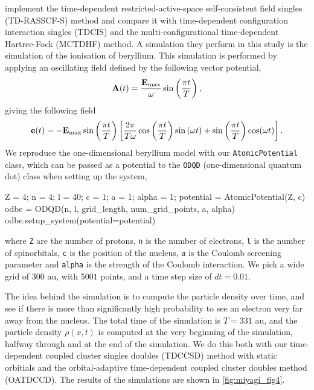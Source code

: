 \citeauthor{miyagi2013time}\cite{miyagi2013time} implement the time-dependent 
restricted-active-space self-consistent field singles (TD-RASSCF-S) method 
and compare it with time-dependent configuration interaction singles (TDCIS) and 
the multi-configurational time-dependent Hartree-Fock (MCTDHF) method. A simulation they 
perform in this study is the simulation of the ionisation of beryllium. This 
simulation is performed by applying an oscillating field defined by the following 
vector potential,
\begin{equation}
    \vb{A}(t) = \frac{\vb{E}_\text{max}}{\omega}\sin\left(\frac{\pi t}{T} \right),
\end{equation}
giving the following field
\begin{equation}
    \vb{e}(t) = - \vb{E}_\text{max}\sin\left(\frac{\pi t}{T} \right)
    \left[
        \frac{2\pi}{T\omega} \cos\left(\frac{\pi t}{T} \right) \sin\left(\omega t \right)
        + \sin\left(\frac{\pi t}{T} \right) \cos(\omega t)
    \right].
\end{equation}
We reproduce the one-dimensional beryllium model with our \lstinline{AtomicPotential}
class, which can be passed as a potential to the \lstinline{ODQD}
(one-dimensional quantum dot) class when setting up the system,
\begin{python}
Z = 4; n = 4; l = 40; c = 1; a = 1; alpha = 1;
potential = AtomicPotential(Z, c)
odbe = ODQD(n, l, grid_length, num_grid_points, a, alpha)
odbe.setup_system(potential=potential)
\end{python}
where \lstinline{Z} are the number of protons, \lstinline{n} is the number of electrons,
\lstinline{l} is the number of spinorbitals, \lstinline{c} is the position of the nucleus,
\lstinline{a} is the Coulomb screening parameter and \lstinline{alpha} is the strength of the 
Coulomb interaction. We pick a wide grid of $300 \text{ au}$, with $5001$ points, and 
a time step size of $dt=0.01$.

The idea behind the simulation is to compute the particle density over time, and see if 
there is more than significantly high probability to see an electron very far away from the 
nucleus. The total time of the simulation is $T=331 \text{ au}$, and the particle density 
$\rho(x, t)$ is computed at the very beginning of the simulation, halfway through 
and at the end of the simulation. We do this both with our time-dependent coupled 
cluster singles doubles (TDCCSD) method with static orbitials and 
the orbital-adaptive time-dependent 
coupled cluster doubles method (OATDCCD). 
The results of the simulations are shown in 
\autoref{fig:miyagi_fig4}.

